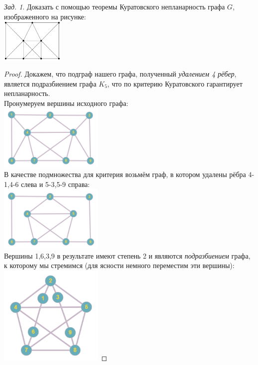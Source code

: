 \documentclass[a4paper,12pt]{article}
\theoremstyle{remark}
\newtheorem{problem}{Зад.}[section]
\begin{document}
\begin{problem}
	Доказать с помощью теоремы Куратовского непланарность графа $G$, изображенного на рисунке:
	\\ \includegraphics[width=3cm]{kuratovsky-task1-stage0.png}
\end{problem}
\begin{proof}
	Докажем, что подграф нашего графа, полученный \textit{удалением 4 рёбер}, является подразбиением графа $K_5$, что по критерию Куратовского гарантирует непланарность.
	\\ Пронумеруем вершины исходного графа:
	\\ \includegraphics[width=5cm]{kuratovsky-task1-stage1.png}
	\\ В качестве подмножества для критерия возьмём граф, в котором удалены рёбра 4-1,4-6 слева и 5-3,5-9 справа:
	\\ \includegraphics[width=5cm]{kuratovsky-task1-stage2.png}
	\\ Вершины 1,6,3,9 в результате имеют степень 2 и являются \textit{подразбиением} графа, к которому мы стремимся (для ясности немного переместим эти вершины):
	\\ \includegraphics[width=5cm]{kuratovsky-task1-stage3.png}

\end{proof}
\end{document}
